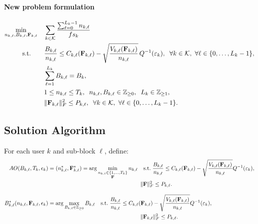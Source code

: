 \documentclass[a4paper, 12pt, onecolumn, journal, twoside, draftclsnofoot]{IEEEtran}
\begin{document}
\paragraph*{New problem formulation}
\begin{equation}
\begin{aligned}
\min_{n_{k,\ell},B_{k,\ell},\F_{k, \ell}}
&\quad \sum_{k \in \mathcal{K}}\frac{\sum_{\ell=0}^{L_k-1} n_{k,\ell}}{fs_k} \\
\text{s.t.}\quad
&\quad \frac{B_{k,\ell}}{n_{k,\ell}}
\le
C_{k,\ell}(\F_{k, \ell} )
-\sqrt{\frac{V_{k,\ell}(\F_{k, \ell} )}{n_{k,\ell}}}\,Q^{-1}(\varepsilon_k),\;\;\forall k \in \mathcal{K},\ \forall \ell \in \{0,\dots,L_k-1\} ,\\
&\quad \sum_{\ell=1}^{L_k} B_{k,\ell}=B_k, \\
&\quad 1\le n_{k,\ell}\le T_k,\;\; n_{k,\ell}, B_{k,\ell}\in\mathbb{Z}_{\ge 0},\;\; L_k\in\mathbb{Z}_{\ge 1},\\
&\quad \|\F_{k, \ell} \|_F^2\le P_{k,\ell},\;\;\forall k \in \mathcal{K},\ \forall \ell \in \{0,\dots,L_k-1\}  .
\end{aligned}
\end{equation}


\subsection{Solution Algorithm}

For each user $k$ and sub-block $\ell$, define:
\begin{align}
AO(B_{k,\ell}, T_k, \epsilon_k)
&= (n^*_{k,\ell}, \F^*_{k,\ell}) =
\arg\min_{\substack{n_{k,\ell}\in\{1,\dots,T_k\} \\ \F}}
n_{k,\ell}
\quad
\text{s.t.}\;
\frac{B_{k,\ell}}{n_{k,\ell}}
\le
C_{k,\ell}(\F_{k, \ell})
-
\sqrt{\frac{V_{k,\ell}(\F_{k, \ell})}{n_{k,\ell}}}
Q^{-1}(\varepsilon_k),
\nonumber\\
&\hspace{5.8cm}
\|\F\|_F^2 \le P_{k,\ell}.
\label{eq:oracle_N}
\\[8pt]
B^*_{k,\ell}(n_{k,\ell}, \F_{k, \ell}, \epsilon_k)
&=
\arg\max_{B_{k,\ell}\in\mathbb{Z}_{\ge0}}
B_{k,\ell}
\quad
\text{s.t.}\;
\frac{B_{k,\ell}}{n_{k,\ell}}
\le
C_{k,\ell}(\F_{k, \ell})
-
\sqrt{\frac{V_{k,\ell}(\F_{k, \ell})}{n_{k,\ell}}}
Q^{-1}(\varepsilon_k),
\nonumber\\
&\hspace{5.8cm}
\|\F_{k, \ell}\|_F^2 \le P_{k,\ell}.
\label{eq:oracle_B}
\end{align}
\end{document}
